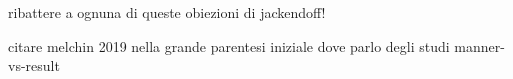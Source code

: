 ribattere a ognuna di queste obiezioni di jackendoff!


citare melchin 2019 nella grande parentesi iniziale dove parlo degli studi manner-vs-result



